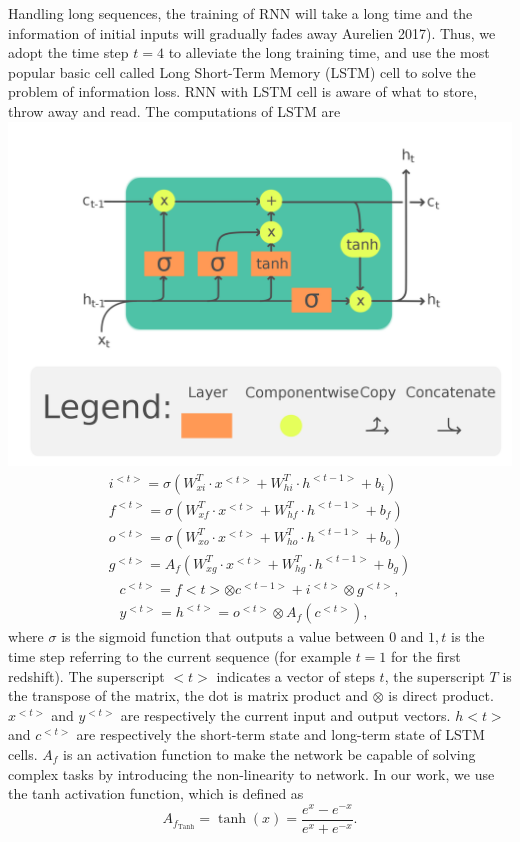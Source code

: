 \documentclass[10pt, a4paper]{article}
\begin{document}
Handling long sequences, the training of RNN will take a long time and the information of initial inputs will gradually fades away Aurelien 2017). Thus, we adopt the time step $t=4$ to alleviate the long training time, and use the most popular basic cell called Long Short-Term Memory (LSTM) cell to solve the problem of information loss. RNN with LSTM cell is aware of what to store, throw away and read. The computations of LSTM are
\includegraphics[max width=\textwidth]{LSTM_Cell.png}
$$
\begin{gathered}
i^{<t>}=\sigma\left(W_{x i}^{T} \cdot x^{<t>}+W_{h i}^{T} \cdot h^{<t-1>}+b_{i}\right) \\
f^{<t>}=\sigma\left(W_{x f}^{T} \cdot x^{<t>}+W_{h f}^{T} \cdot h^{<t-1>}+b_{f}\right) \\
o^{<t>}=\sigma\left(W_{x o}^{T} \cdot x^{<t>}+W_{h o}^{T} \cdot h^{<t-1>}+b_{o}\right) \\
g^{<t>}=A_{f}\left(W_{x g}^{T} \cdot x^{<t>}+W_{h g}^{T} \cdot h^{<t-1>}+b_{g}\right)
\end{gathered}
$$
$$
\begin{gathered}
c^{<t>}=f<t>\otimes c^{<t-1>}+i^{<t>} \otimes g^{<t>}, \\
y^{<t>}=h^{<t>}=o^{<t>} \otimes A_{f}\left(c^{<t>}\right),
\end{gathered}
$$
where $\sigma$ is the sigmoid function that outputs a value between 0 and $1, t$ is the time step referring to the current sequence (for example $t=1$ for the first redshift). The superscript $<t>$ indicates a vector of steps $t$, the superscript $T$ is the transpose of the matrix, the dot is matrix product and $\otimes$ is direct product. $x^{<t>}$ and $y^{<t>}$ are respectively the current input and output vectors. $h<t>$ and $c^{<t>}$ are respectively the short-term state and long-term state of LSTM cells. $A_{f}$ is an activation function to make the network be capable of solving complex tasks by introducing the non-linearity to network. In our work, we use the tanh activation function, which is defined as
$$
A_{f_{\operatorname{Tanh}}}=\tanh (x)=\frac{e^{x}-e^{-x}}{e^{x}+e^{-x}} .
$$
\end{document}

